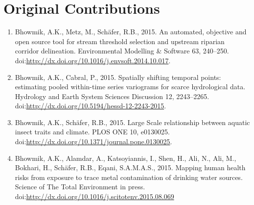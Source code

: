 \chapter{Original Contributions}
\label{Original Contributions}

\begin{enumerate}[(1)]

\item Bhowmik, A.K., Metz, M., Schäfer, R.B., 2015. An automated, objective and open source tool for stream threshold selection and upstream riparian corridor delineation. Environmental Modelling & Software 63, 240–250. doi:\href{http://dx.doi.org/10.1016/j.envsoft.2014.10.017}{http://dx.doi.org/10.1016/j.envsoft.2014.10.017}.

\item Bhowmik, A.K., Cabral, P., 2015. Spatially shifting temporal points: estimating pooled within-time series variograms for scarce hydrological data. Hydrology and Earth System Sciences Discussion 12, 2243–2265. doi:\href{http://dx.doi.org/10.5194/hessd-12-2243-2015}{http://dx.doi.org/10.5194/hessd-12-2243-2015}.

\item Bhowmik, A.K., Schäfer, R.B., 2015. Large Scale relationship between aquatic insect traits and climate. PLOS ONE 10, e0130025. doi:\href{http://dx.doi.org/10.1371/journal.pone.0130025}{http://dx.doi.org/10.1371/journal.pone.0130025}.

\item Bhowmik, A.K., Alamdar, A., Katsoyiannis, I., Shen, H., Ali, N., Ali, M., Bokhari, H., Schäfer, R.B., Eqani, S.A.M.A.S., 2015. Mapping human health risks from exposure to trace metal contamination of drinking water sources. Science of The Total Environment in press. doi:\href{http://dx.doi.org/10.1016/j.scitotenv.2015.08.069}{http://dx.doi.org/10.1016/j.scitotenv.2015.08.069}

\end{enumerate}